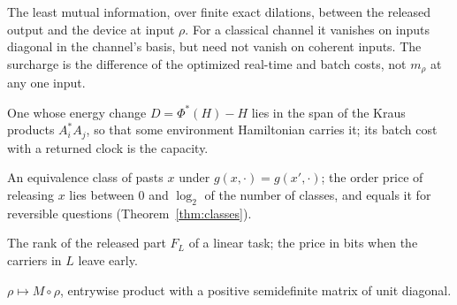 \begin{description}[leftmargin=!,labelwidth=3.6cm,style=nextline,itemsep=2pt]
\item[Correlation term $m_\rho$] The least mutual information, over finite exact dilations, between the released output and the device at input $\rho$. For a classical channel it vanishes on inputs diagonal in the channel's basis, but need not vanish on coherent inputs. The surcharge is the difference of the optimized real-time and batch costs, not $m_\rho$ at any one input.
\item[Balanced channel] One whose energy change $D=\Phi^*(H)-H$ lies in the span of the Kraus products $A_i^*A_j$, so that some environment Hamiltonian carries it; its batch cost with a returned clock is the capacity.
\item[Continuation class] An equivalence class of pasts $x$ under $g(x,\cdot)=g(x',\cdot)$; the order price of releasing $x$ lies between $0$ and $\log_2$ of the number of classes, and equals it for reversible questions (Theorem~\ref{thm:classes}).
\item[Release rank] The rank of the released part $F_L$ of a linear task; the price in bits when the carriers in $L$ leave early.
\item[Generalized dephasing (Schur) channel] $\rho\mapsto M\circ\rho$, entrywise product with a positive semidefinite matrix of unit diagonal.
\end{description}

